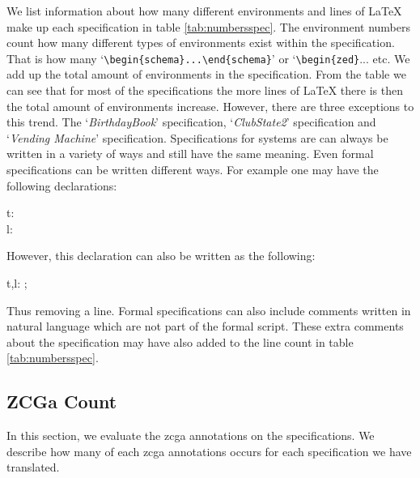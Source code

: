 We list information about how many different environments and lines of \LaTeX{}
make up each specification in table \ref{tab:numbersspec}. The environment
numbers count how many different types of environments exist within the
specification. That is how many `\verb|\begin{schema}...\end{schema}|' or
`\verb|\begin{zed}|... etc. We add up the total amount of environments in the
specification. From the table we can see that for most of the specifications the
more lines of \LaTeX{} there is then the total amount of environments increase.
However, there are three exceptions to this trend. The `\emph{BirthdayBook}'
specification, `\emph{ClubState2}' specification and `\emph{Vending Machine}'
specification. Specifications for systems are can always be written in a variety
of ways and still have the same meaning. Even formal specifications can be
written different ways. For example one may have the following declarations:

\begin{zed}
t:\nat \\
l: \nat 
\end{zed}

However, this declaration can also be written as the following:
\begin{zed}
t,l: ;\nat
\end{zed}

Thus removing a line. Formal specifications can also include comments written in
natural language which are not part of the formal script. These extra comments
about the specification may have also added to the line count in table
\ref{tab:numbersspec}.

\subsection{ZCGa Count}

In this section, we evaluate the \gls{zcga} annotations on the specifications.
We describe how many of each \gls{zcga} annotations occurs for each
specification we have translated.

